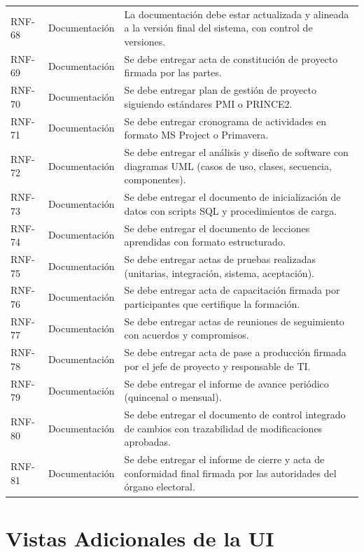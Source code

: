 \documentclass[12pt,a4paper,oneside]{book}
\begin{document}
\begin{longtable}{@{}>{\centering\arraybackslash}p{2cm}
                    >{\centering\arraybackslash}p{3cm}
                    >{\raggedright\arraybackslash}p{10cm}@{}}
RNF-68 & Documentación & La documentación debe estar actualizada y alineada a la versión final del sistema, con control de versiones. \\
RNF-69 & Documentación & Se debe entregar acta de constitución de proyecto firmada por las partes. \\
RNF-70 & Documentación & Se debe entregar plan de gestión de proyecto siguiendo estándares PMI o PRINCE2. \\
RNF-71 & Documentación & Se debe entregar cronograma de actividades en formato MS Project o Primavera. \\
RNF-72 & Documentación & Se debe entregar el análisis y diseño de software con diagramas UML (casos de uso, clases, secuencia, componentes). \\
RNF-73 & Documentación & Se debe entregar el documento de inicialización de datos con scripts SQL y procedimientos de carga. \\
RNF-74 & Documentación & Se debe entregar el documento de lecciones aprendidas con formato estructurado. \\
RNF-75 & Documentación & Se debe entregar actas de pruebas realizadas (unitarias, integración, sistema, aceptación). \\
RNF-76 & Documentación & Se debe entregar acta de capacitación firmada por participantes que certifique la formación. \\
RNF-77 & Documentación & Se debe entregar actas de reuniones de seguimiento con acuerdos y compromisos. \\
RNF-78 & Documentación & Se debe entregar acta de pase a producción firmada por el jefe de proyecto y responsable de TI. \\
RNF-79 & Documentación & Se debe entregar el informe de avance periódico (quincenal o mensual). \\
RNF-80 & Documentación & Se debe entregar el documento de control integrado de cambios con trazabilidad de modificaciones aprobadas. \\
RNF-81 & Documentación & Se debe entregar el informe de cierre y acta de conformidad final firmada por las autoridades del órgano electoral. \\
\end{longtable}
\endgroup

\chapter{Vistas Adicionales de la UI}
\label{anexo:vistas-ui}
\end{document}
